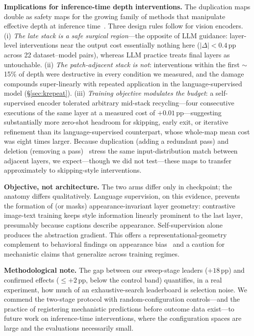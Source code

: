 \documentclass{article}
\newcommand{\pp}{\,\mathrm{pp}}
\begin{document}
\textbf{Implications for inference-time depth interventions.} The
duplication maps double as safety maps for the growing family of methods
that manipulate effective depth at inference
time~\citep{schuster2022confident,elhoushi2024layerskip,raposo2024mixture,huang2018multi,yin2022avit}.
Three design rules follow for vision encoders. (i) \emph{The late stack
is a safe surgical region}---the opposite of LLM guidance: layer-level
interventions near the output cost essentially nothing here
($|\Delta| < 0.4\pp$ across 22 dataset--model pairs), whereas LLM
practice treats final layers as untouchable. (ii) \emph{The
patch-adjacent stack is not}: interventions within the first
$\sim$15\% of depth were destructive in every condition we measured, and
the damage compounds super-linearly with repeated application in the
language-supervised model (\S\ref{sec:krepeat}). (iii) \emph{Training
objective modulates the budget}: a self-supervised encoder tolerated
arbitrary mid-stack recycling---four consecutive executions of the same
layer at a measured cost of $+0.01\pp$---suggesting substantially more
zero-shot headroom for skipping, early exit, or iterative refinement
than its language-supervised counterpart, whose whole-map mean cost was
eight times larger. Because duplication (adding a redundant pass) and
deletion (removing a pass)~\citep{lad2024remarkable} stress the same
input-distribution match between adjacent layers, we expect---though we
did not test---these maps to transfer approximately to skipping-style
interventions.

\textbf{Objective, not architecture.} The two arms differ only in
checkpoint; the anatomy differs qualitatively. Language supervision, on
this evidence, prevents the formation of (or masks) appearance-invariant
layer geometry: contrastive image-text training keeps style information
linearly prominent to the last layer, presumably because captions
describe appearance. Self-supervision alone produces the abstraction
gradient. This offers a representational-geometry complement to
behavioral findings on appearance bias~\citep{geirhos2019imagenet} and a
caution for mechanistic claims that generalize across training regimes.

\textbf{Methodological note.} The gap between our sweep-stage leaders
($+18\pp$) and confirmed effects ($\le +2\pp$, below the control band)
quantifies, in a real experiment, how much of an exhaustive-search
leaderboard is selection noise. We commend the two-stage protocol with
random-configuration controls---and the practice of registering
mechanistic predictions before outcome data exist---to future work on
inference-time interventions, where the configuration spaces are large
and the evaluations necessarily small.
\end{document}
